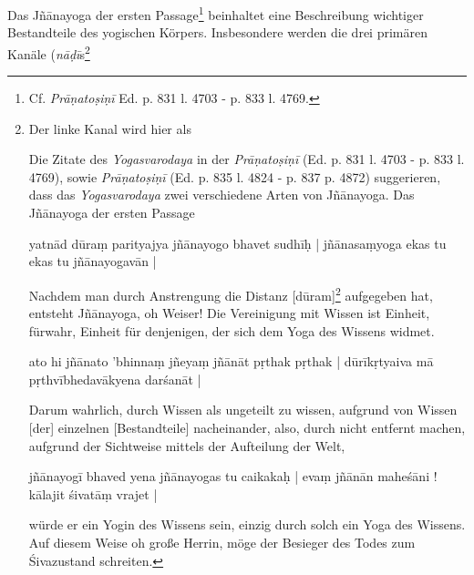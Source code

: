 Das Jñānayoga der ersten Passage\footnote{Cf. \textit{Prāṇatoṣiṇī} Ed. p. 831 l. 4703 - p. 833 l. 4769.} beinhaltet eine Beschreibung wichtiger Bestandteile des yogischen Körpers. Insbesondere werden die drei primären Kanäle (\textit{nāḍī}s\footnote{Der linke Kanal wird hier als 


Die Zitate des \textit{Yogasvarodaya} in der \textit{Prāṇatoṣiṇī} (Ed. p. 831 l. 4703 - p. 833 l. 4769), sowie \textit{Prāṇatoṣiṇī} (Ed. p. 835 l. 4824 - p. 837 p. 4872) suggerieren, dass das \textit{Yogasvarodaya} zwei verschiedene Arten von Jñānayoga. Das Jñānayoga der ersten Passage  





yatnād dūraṃ parityajya jñānayogo bhavet sudhīḥ |
jñānasaṃyoga ekas tu ekas tu jñānayogavān |

Nachdem man durch Anstrengung die Distanz [dūram]\footnote{Die scheinbare Kluft zwischen der fragmentierten Welt der zehn \textit{tattva}s und ihrer zu Grunde liegenden inneren Einheit.} aufgegeben hat, entsteht Jñānayoga, oh Weiser! Die Vereinigung mit Wissen ist Einheit, fürwahr, Einheit für denjenigen, der sich dem Yoga des Wissens widmet.

ato hi jñānato 'bhinnaṃ jñeyaṃ jñānāt pṛthak pṛthak |
dūrīkṛtyaiva mā pṛthvībhedavākyena darśanāt |

Darum wahrlich, durch Wissen als ungeteilt zu wissen, aufgrund von Wissen [der] einzelnen [Bestandteile] nacheinander, also, durch nicht entfernt machen, aufgrund der Sichtweise mittels der Aufteilung der Welt, 

jñānayogī bhaved yena jñānayogas tu caikakaḥ |
evaṃ jñānān maheśāni ! kālajit śivatāṃ vrajet | 

würde er ein Yogin des Wissens sein, einzig durch solch ein Yoga des Wissens.
Auf diesem Weise oh große Herrin, möge der Besieger des Todes zum Śivazustand schreiten. 







}
